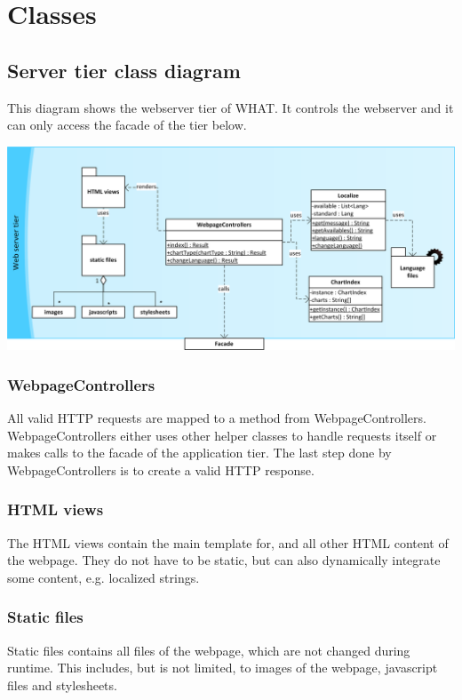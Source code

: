 \section{Classes}


\subsection{Server tier class diagram}
This diagram shows the webserver tier of WHAT. It controls the webserver and it can only access the facade of the tier below.
\begin{center}
\includegraphics[width=1\linewidth]{Pictures/ServerTierDia.png}
\end{center}   


\subsubsection*{WebpageControllers}
All valid HTTP requests are mapped to a method from WebpageControllers.
WebpageControllers either uses other helper classes to handle requests itself  
or makes calls to the facade of the application tier. 
The last step done by WebpageControllers is to create a valid HTTP response.
                                                                            

\subsubsection*{HTML views}
The HTML views contain the main template for, and all other HTML content of the webpage. %
They do not have to be static, but can also dynamically integrate some content, e.g. localized strings.

\subsubsection*{Static files}
Static files contains all files of the webpage, which are not changed during runtime. 
This includes, but is not limited, to images of the webpage, javascript files and stylesheets.

